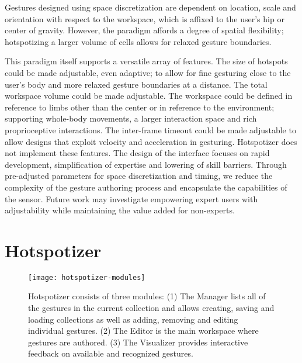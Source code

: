 Gestures designed using space discretization are dependent on location, scale and orientation with respect to the workspace, which is affixed to the user's hip or center of gravity. However, the paradigm affords a degree of spatial flexibility; hotspotizing a larger volume of cells allows for relaxed gesture boundaries.

This paradigm itself supports a versatile array of features. The size of hotspots could be made adjustable, even adaptive; to allow for fine gesturing close to the user’s body and more relaxed gesture boundaries at a distance. The total workspace volume could be made adjustable. The workspace could be defined in reference to limbs other than the center or in reference to the environment; supporting whole-body movements, a larger interaction space and rich proprioceptive interactions. The inter-frame timeout could be made adjustable to allow designs that exploit velocity and acceleration in gesturing. Hotspotizer does not implement these features. The design of the interface focuses on rapid development, simplification of expertise and lowering of skill barriers. Through pre-adjusted parameters for space discretization and timing, we reduce the complexity of the gesture authoring process and encapsulate the capabilities of the sensor. Future work may investigate empowering expert users with adjustability while maintaining the value added for non-experts.


\section{Hotspotizer}
\label{sec:hotspotizer}

\begin{figure}[ht]
\centering
\texttt{[image: hotspotizer-modules]}
\caption{Hotspotizer consists of three modules: (1) The Manager lists all of the gestures in the current collection and allows creating, saving and loading collections as well as adding, removing and editing individual gestures. (2) The Editor is the main workspace where gestures are authored. (3) The Visualizer provides interactive feedback on available and recognized gestures.}
\label{fig:hotspotizer-modules}
\end{figure}

